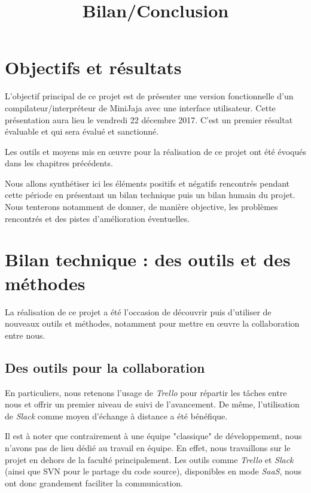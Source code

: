 \documentclass[a4paper,12pt]{article}
\title{Bilan/Conclusion}
\begin{document}
\maketitle



\section{Objectifs et résultats}

L'objectif principal de ce projet est de présenter une version fonctionnelle d'un compilateur/interpréteur de MiniJaja avec une interface utilisateur. Cette présentation aura lieu le vendredi 22 décembre 2017. C'est un premier résultat évaluable et qui sera évalué et sanctionné.

Les outils et moyens mis en œuvre pour la réalisation de ce projet ont été évoqués dans les chapitres précédents.

Nous allons synthétiser ici les éléments positifs et négatifs rencontrés pendant cette période en présentant un bilan technique puis un bilan humain du projet. Nous tenterons notamment de donner, de manière objective, les problèmes rencontrés et des pistes d'amélioration éventuelles.


\section{Bilan technique : des outils et des méthodes}

La réalisation de ce projet a été l'occasion de découvrir puis d'utiliser de nouveaux outils et méthodes, notamment pour mettre en œuvre la collaboration entre nous.

\subsection{Des outils pour la collaboration}

En particuliers, nous retenons l'usage de \emph{Trello} pour répartir les tâches entre nous et offrir un premier niveau de suivi de l'avancement. De même, l'utilisation de \emph{Slack} comme moyen d'échange à distance a été bénéfique.

Il est à noter que contrairement à une équipe "classique" de développement, nous n'avons pas de lieu dédié au travail en équipe. En effet, nous travaillons sur le projet en dehors de la faculté principalement. Les outils comme \emph{Trello} et \emph{Slack} (ainsi que SVN pour le partage du code source), disponibles en mode \emph{SaaS}, nous ont donc grandement faciliter la communication.
\end{document}
